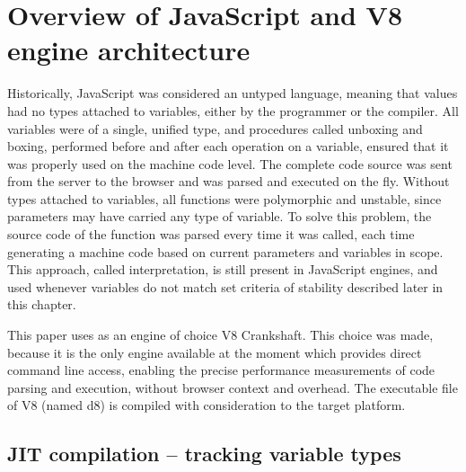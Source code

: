 \chapter{Overview of JavaScript and V8 engine architecture}
\label{cha:overview}

Historically, JavaScript was considered an untyped language, meaning that values had no types attached to variables, either by the programmer or the compiler. All variables were of a single, unified type, and procedures called unboxing and boxing, performed before and after each operation on a variable, ensured that it was properly used on the machine code level. The complete code source was sent from the server to the browser and was parsed and executed on the fly. Without types attached to variables, all functions were polymorphic and unstable, since parameters may have carried any type of variable. To solve this problem, the source code of the function was parsed every time it was called, each time generating a machine code based on current parameters and variables in scope. This approach, called interpretation, is still present in JavaScript engines, and used whenever variables do not match set criteria of stability described later in this chapter.

This paper uses as an engine of choice V8 Crankshaft. This choice was made, because it is the only engine available at the moment which provides direct command line access, enabling the precise performance measurements of code parsing and execution, without browser context and overhead. The executable file of V8 (named d8) is compiled with consideration to the target platform.

\section{JIT compilation -- tracking variable types}
\label{sec:JIT}

